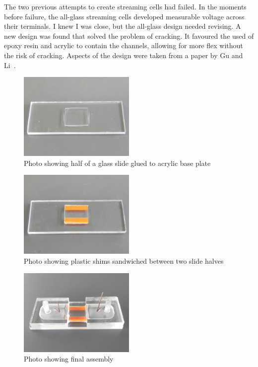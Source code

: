     The two previous attempts to create streaming cells had failed.
    In the moments before failure, the all-glass streaming cells developed measurable voltage across their terminals.
    I knew I was close, but the all-glass design needed revising.
    A new design was found that solved the problem of cracking.
    It favoured the used of epoxy resin and acrylic to contain the channels, allowing for more flex without the risk of cracking.
    Aspects of the design were taken from a paper by Gu and Li~\cite{Gu2000}.

    \begin{figure}[p]
      \centering
      \includegraphics[width=0.5\textwidth]{content/pt1/01-PowerHarvesting/graphics/Photo_streamingPotential_Assembly_Step1.JPG}
      \caption{\label{fig:Photo_streamingPotential_Assembly_Step1}Photo showing half of a glass slide glued to acrylic base plate}
    \end{figure}
    \begin{figure}[p]
      \centering
      \includegraphics[width=0.5\textwidth]{content/pt1/01-PowerHarvesting/graphics/Photo_streamingPotential_Assembly_Step2.JPG}
      \caption{\label{fig:Photo_streamingPotential_Assembly_Step2}Photo showing plastic shims sandwiched between two slide halves}
    \end{figure}
    \begin{figure}[p]
      \centering
      \includegraphics[width=0.5\textwidth]{content/pt1/01-PowerHarvesting/graphics/Photo_streamingPotential_Assembly_Step3.JPG}
      \caption{\label{fig:Photo_streamingPotential_Assembly_Step3}Photo showing final assembly}
    \end{figure}


